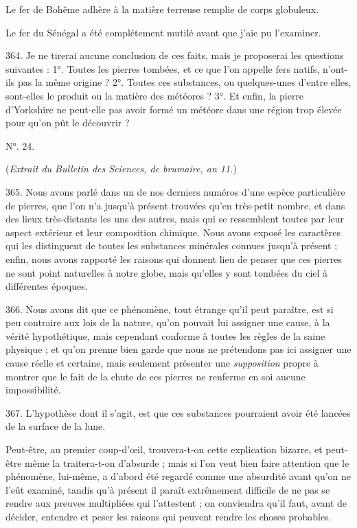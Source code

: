 \documentclass[a4paper, 11pt, oneside, polutonikogreek, french]{article}
\begin{document}
Le fer de Bohême adhère à la matière terreuse remplie de corps globuleux.

Le fer du Sénégal a été complétement mutilé avant que j'aie pu l'examiner.

364. Je ne tirerai aucune conclusion de ces faits, mais je proposerai les questions suivantes : 1°. Toutes les pierres tombées, et ce que l'on appelle fers natifs, n'ont-ils pas la même origine ? 2°. Toutes ces substances, ou quelques-unes d'entre elles, sont-elles le produit ou la matière des météores ? 3°. Et enfin, la pierre d'Yorkshire ne peut-elle pas avoir formé un météore dans une région trop élevée pour qu'on pût le découvrir ?

\begin{center}
N°. 24.
\end{center}

\begin{center}
(\emph{Extrait du Bulletin des Sciences, de brumaire, an 11.})
\end{center}

365. \og Nous avons parlé dans un de nos derniers numéros d'une espèce particulière de pierres, que l'on n'a jusqu'à présent trouvées qu'en très-petit nombre, et dans des lieux très-distants les uns des autres, mais qui se ressemblent toutes par leur aspect extérieur et leur composition chimique. Nous avons exposé les caractères qui les distinguent de toutes les substances minérales connues jusqu'à présent ; enfin, nous avons rapporté les raisons qui donnent lieu de penser que ces pierres ne sont point naturelles à notre globe, mais qu'elles y sont tombées du ciel à différentes époques. \fg

366. \og Nous avons dit que ce phénomène, tout étrange qu'il peut paraître, est si peu contraire aux lois de la nature, qu'on pouvait lui assigner une cause, à la vérité hypothétique, mais cependant conforme à toutes les règles de la saine physique ; et qu'on prenne bien garde que nous ne prétendons pas ici assigner une cause réelle et certaine, mais seulement présenter une \emph{supposition} propre à montrer que le fait de la chute de ces pierres ne renferme en soi aucune impossibilité. \fg

367. L'hypothèse dont il s'agit, est que ces substances pourraient avoir été lancées de la surface de la lune.

Peut-être, au premier coup-d'œil, trouvera-t-on cette explication bizarre, et peut-être même la traitera-t-on d'absurde ; mais si l'on veut bien faire attention que le phénomène, lui-même, a d'abord été regardé comme une absurdité avant qu'on ne l'eût examiné, tandis qu'à présent il paraît extrêmement difficile de ne pas se rendre aux preuves multipliées qui l'attestent ; on conviendra qu'il faut, avant de décider, entendre et peser les raisons qui peuvent rendre les choses probables.
\end{document}
